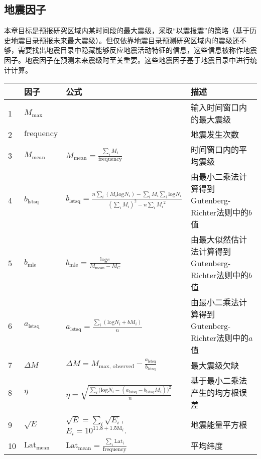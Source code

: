 \subsection{地震因子}\label{sec:seism_indicator}

本章目标是预报研究区域内某时间段的最大震级，采取“以震报震”的策略（基于历史地震目录预报未来最大震级）。但仅依靠地震目录预测研究区域内的震级还不够，需要找出地震目录中隐藏能够反应地震活动特征的信息，这些信息被称作地震因子。地震因子在预测未来震级时至关重要。这些地震因子基于地震目录中进行统计计算。

\begin{sidewaystable}[htpb]
  \centering
  \label{tab:seism_input_data}
  \footnotesize
  \begin{tabular}{llll}
    \toprule
      & 因子 & 公式 & 描述 \\
    \midrule
    1 & $M_{\text{max}}$ &  & 输入时间窗口内的最大震级 \\ 
    2 & $\text{frequency}$ &  & 地震发生次数 \\ 
    3 & $M_{\text{mean}}$ & $\displaystyle M_{\text{mean}}=\frac{\sum_i{M_i}}{\text{frequency}}$ & 时间窗口内的平均震级 \\ 
    4 & $b_{\text{lstsq}}$ & $\displaystyle b_{\text{lstsq}}=\frac{n\sum_i{(M_i\text{log} N_i)}-\sum_i{M_i}\sum_i\text{log}N_i}{(\sum_i{M_i})^2-n\sum_i{{M_i}^2}}$ & 由最小二乘法计算得到Gutenberg-Richter法则中的$b$值\\
    5 & $b_{\text{mle}}$ & $\displaystyle b_{\text{mle}}=\frac{\text{log}e}{M_{\text{mean}}-M_C}$ & 由最大似然估计法计算得到Gutenberg-Richter法则中的$b$值 \\ 
    6 & $a_{\text{lstsq}}$ & $\displaystyle a_{\text{lstsq}}=\frac{\sum_i{(\text{log}N_i+bM_i)}}{n}$ & 由最小二乘法计算得到Gutenberg-Richter法则中的$a$值 \\ 
    7 & $\Delta M$ & $\displaystyle \Delta M=M_{\text{max, observed}}- \frac{a_{\text{lstsq}}}{b_{\text{lstsq}}}$ & 最大震级欠缺 \\ 
    8 & $\eta$ & $\displaystyle \eta=\sqrt{\frac{\sum_i{(\text{log} {N_i}}-(a_{\text{lstsq}}-b_{\text{lstsq}}{M_i}))^2}{n}}$ & 基于最小二乘法产生的均方根误差 \\ 
    9 & $\sqrt{E}$ & $\displaystyle \sqrt{E}=\sum_i{\sqrt{E_i}}$, $\displaystyle E_i=10^{11.8+1.5\text{M}_i}.$ & 地震能量平方根\citep{Last2016predicting,asim2017earthquake}  \\ 
    10 & $\text{Lat}_{\text{mean}}$ & $\displaystyle \text{Lat}_{\text{mean}}=\frac{\sum_i{\text{Lat}_i}}{\text{frequency}}$ & 平均纬度 \\ 

\end{tabular}
\end{sidewaystable}
